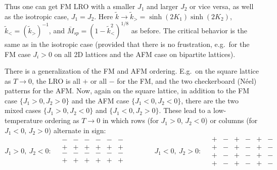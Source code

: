 \begin{diagram}
\end{diagram}

Thus one can get FM LRO with a smaller $J_1$ and larger $J_2$ or vice versa, as well as the isotropic
case, $J_1 = J_2$. Here $\tilde k\to\tilde k_> = \sinh(2K_1)\sinh(2K_2)$, $\tilde k_< = (\tilde k_>)^{-1}$,
and $\bar M_{sp} = (1-\tilde k_<^2)^{1/8}$ as before. The critical behavior is the same as in the
isotropic case (provided that there is no frustration, e.g.\ for the FM case $J_i>0$ on all 2D lattices
and the AFM case on bipartite lattices).

There is a generalization of the FM and AFM ordering. E.g.\ on the square lattice as $T\to 0$, the LRO
is all $+$ or all $-$ for the FM, and the two checkerboard (N\'eel) patterns for the AFM. Now, again on
the square lattice, in addition to the FM case $\{J_1>0,J_2>0\}$ and the AFM case $\{J_1<0,J_2<0\}$,
there are the two mixed cases $\{J_1>0,J_2<0\}$ and $\{J_1<0,J_2>0\}$. These lead to a low-temperature
ordering as $T\to 0$ in which rows (for $J_1>0$, $J_2<0$) or columns (for $J_1<0$, $J_2>0$) alternate
in sign:
\begin{equation*}
  J_1>0,\ J_2<0:\quad
  \begin{array}{cccccc}
    - & - & - & - & - & -\\ + & + & + & + & + & +\\ - & - & - & - & - & -\\ + & + & + & + & + & +
  \end{array}
  \qquad\qquad
  J_1<0,\ J_2>0:\quad
  \begin{array}{cccccc}
    + & - & + & - & + & -\\ + & - & + & - & + & -\\ + & - & + & - & + & -\\ + & - & + & - & + & -
  \end{array}
\end{equation*}

